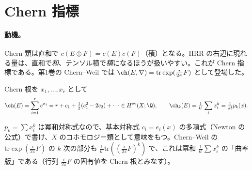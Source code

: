 \section{Chern 指標}\label{sec:ch}
\paragraph{動機。}Chern 類は直和で $c(E\oplus F)=c(E)c(F)$（積）となる。HRR の右辺に現れる量は、直和で\emph{和}、テンソル積で\emph{積}になるほうが扱いやすい。これが Chern 指標である。第1巻の Chern--Weil では $\ch(E,\nabla)=\mathrm{tr}\exp(\frac i{2\pi}F)$ として登場した。
\begin{defn}[Chern 指標]\label{def:ch}
Chern 根を $x_1,\dots,x_r$ として
\[
\ch(E)=\sum_{i=1}^re^{x_i}=r+c_1+\tfrac12(c_1^2-2c_2)+\cdots\in H^{\rm ev}(X;\Q),\qquad \ch_k(E)=\tfrac1{k!}\sum_ix_i^k=\tfrac1{k!}p_k(x).
\]
\end{defn}
\noindent $p_k=\sum x_i^k$ は冪和対称式なので、基本対称式 $c_i=e_i(x)$ の多項式（Newton の公式）で書け、$X$ のコホモロジー類として意味をもつ。Chern--Weil の $\mathrm{tr}\exp(\frac i{2\pi}F)$ の $k$ 次の部分も $\frac1{k!}\mathrm{tr}((\frac i{2\pi}F)^k)$ で、これは冪和 $\frac1{k!}\sum x_i^k$ の「曲率版」である（行列 $\frac{i}{2\pi}F$ の固有値を Chern 根とみなす）。

